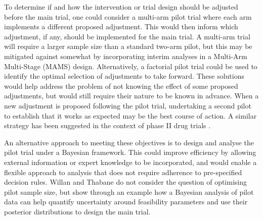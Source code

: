 \documentclass{bmcart}
\begin{document}
To determine if and how the intervention or trial design should be adjusted before the main trial, one could consider a multi-arm pilot trial where each arm implements a different proposed adjustment. This would then inform which adjustment, if any, should be implemented for the main trial. A multi-arm trial will require a larger sample size than a standard two-arm pilot, but this may be mitigated against somewhat by incorporating interim analyses in a Multi-Arm Multi-Stage (MAMS) design. Alternatively, a factorial pilot trial could be used to identify the optimal selection of adjustments to take forward. These solutions would help address the problem of not knowing the effect of some proposed adjustments, but would still require their nature to be known in advance. When a new adjustment is proposed following the pilot trial, undertaking a second pilot to establish that it works as expected may be the best course of action. A similar strategy has been suggested in the context of phase II drug trials \cite{Brown2012}.

An alternative approach to meeting these objectives is to design and analyse the pilot trial under a Bayesian framework\cite{Hampson2017, Wilson2021}. This could improve efficiency by allowing external information or expert knowledge to be incorporated, and would enable a flexible approach to analysis that does not require adherence to pre-specified decision rules. Willan and Thabane \cite{Willan2020} do not consider the question of optimising pilot sample size, but show through an example how a Bayesian analysis of pilot data can help quantify uncertainty around feasibility parameters and use their posterior distributions to design the main trial. 

\end{document}
